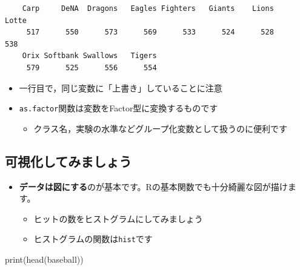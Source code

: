 \documentclass[
  a4paper,
]{ltjsbook}
\newenvironment{Shaded}{\begin{snugshade}}{\end{snugshade}}
\newcommand{\FunctionTok}[1]{\textcolor[rgb]{0.28,0.35,0.67}{#1}}
\newcommand{\NormalTok}[1]{\textcolor[rgb]{0.00,0.23,0.31}{#1}}
\newcommand{\OtherTok}[1]{\textcolor[rgb]{0.00,0.23,0.31}{#1}}
\newcommand{\SpecialCharTok}[1]{\textcolor[rgb]{0.37,0.37,0.37}{#1}}
\providecommand{\tightlist}{%
  \setlength{\itemsep}{0pt}\setlength{\parskip}{0pt}}\usepackage{longtable,booktabs,array}
\begin{document}
\begin{Shaded}
\end{Shaded}

\begin{verbatim}
    Carp     DeNA  Dragons   Eagles Fighters   Giants    Lions    Lotte 
     517      550      573      569      533      524      528      538 
    Orix Softbank Swallows   Tigers 
     579      525      556      554 
\end{verbatim}

\begin{itemize}
\tightlist
\item
  一行目で，同じ変数に「上書き」していることに注意
\item
  \texttt{as.factor}関数は変数をFactor型に変換するものです

  \begin{itemize}
  \tightlist
  \item
    クラス名，実験の水準などグループ化変数として扱うのに便利です
  \end{itemize}
\end{itemize}

\subsection{可視化してみましょう}\label{ux53efux8996ux5316ux3057ux3066ux307fux307eux3057ux3087ux3046}

\begin{itemize}
\tightlist
\item
  \textbf{データは図にする}のが基本です。Rの基本関数でも十分綺麗な図が描けます。

  \begin{itemize}
  \tightlist
  \item
    ヒットの数をヒストグラムにしてみましょう
  \item
    ヒストグラムの関数は\texttt{hist}です
  \end{itemize}
\end{itemize}

\begin{Shaded}
\begin{Highlighting}[]
\FunctionTok{print}\NormalTok{(}\FunctionTok{head}\NormalTok{(baseball))}
\end{Highlighting}
\end{Shaded}
\end{document}

